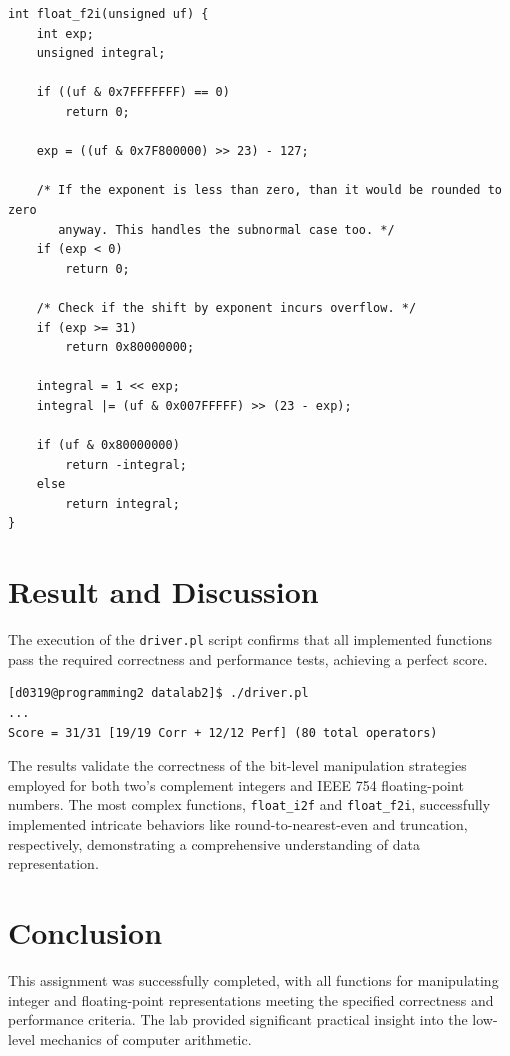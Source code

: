 \documentclass{article}
\begin{document}
\begin{verbatim}
int float_f2i(unsigned uf) {
    int exp;
    unsigned integral;

    if ((uf & 0x7FFFFFFF) == 0)
        return 0;

    exp = ((uf & 0x7F800000) >> 23) - 127;

    /* If the exponent is less than zero, than it would be rounded to zero
       anyway. This handles the subnormal case too. */
    if (exp < 0)
        return 0;

    /* Check if the shift by exponent incurs overflow. */
    if (exp >= 31)
        return 0x80000000;

    integral = 1 << exp;
    integral |= (uf & 0x007FFFFF) >> (23 - exp);

    if (uf & 0x80000000)
        return -integral;
    else
        return integral;
}
\end{verbatim}

\section{Result and Discussion}

The execution of the \verb|driver.pl| script confirms that all implemented
functions pass the required correctness and performance tests, achieving a
perfect score.

\begin{verbatim}
[d0319@programming2 datalab2]$ ./driver.pl
...
Score = 31/31 [19/19 Corr + 12/12 Perf] (80 total operators)
\end{verbatim}

The results validate the correctness of the bit-level manipulation strategies 
employed for both two's complement integers and IEEE 754 floating-point numbers. 
The most complex functions, \texttt{float\_i2f} and \texttt{float\_f2i}, 
successfully implemented intricate behaviors like round-to-nearest-even and 
truncation, respectively, demonstrating a comprehensive understanding of data 
representation.

\section{Conclusion}

This assignment was successfully completed, with all functions for manipulating 
integer and floating-point representations meeting the specified correctness and 
performance criteria. The lab provided significant practical insight into the 
low-level mechanics of computer arithmetic.
\end{document}
